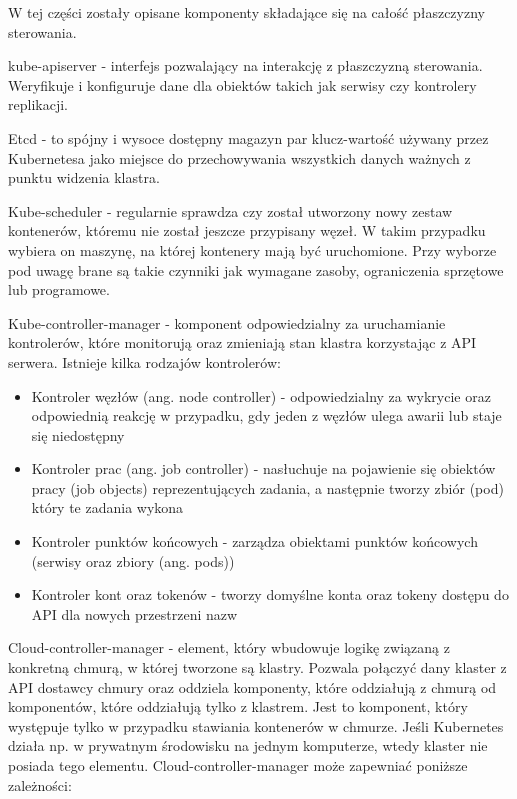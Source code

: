 \documentclass[11pt, a4]{article} %
\begin{document}
W tej części zostały opisane komponenty składające się na całość płaszczyzny 
sterowania.

kube-apiserver - interfejs pozwalający na interakcję z płaszczyzną sterowania. 
Weryfikuje i konfiguruje dane dla obiektów takich jak serwisy czy kontrolery 
replikacji. 

Etcd - to spójny i wysoce dostępny magazyn par klucz-wartość używany przez Kubernetesa 
jako miejsce do przechowywania wszystkich danych ważnych z punktu widzenia klastra. 

Kube-scheduler - regularnie sprawdza czy został utworzony nowy zestaw 
kontenerów, któremu nie został jeszcze przypisany węzeł. W takim przypadku wybiera 
on maszynę, na której kontenery mają być uruchomione. Przy wyborze pod uwagę brane są 
takie czynniki jak wymagane zasoby, ograniczenia sprzętowe lub programowe.

Kube-controller-manager - komponent odpowiedzialny za uruchamianie kontrolerów, które 
monitorują oraz zmieniają stan klastra korzystając z API serwera. Istnieje kilka 
rodzajów kontrolerów:

\begin{itemize} %
    \item Kontroler węzłów (ang. node controller) - odpowiedzialny za wykrycie oraz 
    odpowiednią reakcję w przypadku, gdy jeden z węzłów ulega awarii lub staje się 
    niedostępny
    \item Kontroler prac (ang. job controller) - nasłuchuje na pojawienie się obiektów 
    pracy (job objects) reprezentujących zadania, a następnie tworzy zbiór (pod) który 
    te zadania wykona
    \item Kontroler punktów końcowych - zarządza obiektami punktów końcowych (serwisy 
    oraz zbiory (ang. pods))
    \item Kontroler kont oraz tokenów - tworzy domyślne konta oraz tokeny dostępu do 
    API dla nowych przestrzeni nazw
\end{itemize}

Cloud-controller-manager - element, który wbudowuje logikę związaną z konkretną 
chmurą, w której tworzone są klastry. Pozwala połączyć dany klaster z API dostawcy 
chmury oraz oddziela komponenty, które oddziałują z chmurą od komponentów, które 
oddziałują tylko z klastrem. Jest to komponent, który występuje tylko w przypadku 
stawiania kontenerów w chmurze. Jeśli Kubernetes działa np. w prywatnym środowisku 
na jednym komputerze, wtedy klaster nie posiada tego elementu. 
Cloud-controller-manager może zapewniać poniższe zależności:
\end{document}

